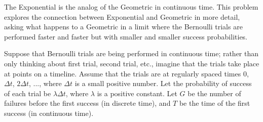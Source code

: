 

\setcounter{theorem}{42}
\begin{exercise}[BH.5.43] The Exponential is the analog of the Geometric in continuous time. This problem explores the connection between Exponential and Geometric in more detail, asking what happens to a Geometric in a limit where the Bernoulli trials are performed faster and faster but with smaller and smaller success probabilities.
	
	Suppose that Bernoulli trials are being performed in continuous time; rather than only thinking about first trial, second trial, etc., imagine that the trials take place at points on a timeline. Assume that the trials are at regularly spaced times $0$, $\Delta t$, $2 \Delta t$, ..., where $\Delta t$ is a small positive number. Let the probability of success of each trial be $\lambda \Delta t$, where $\lambda$ is a positive constant. Let $G$ be the number of failures before the first success (in discrete time), and $T$ be the time of the first success (in continuous time).
	

\end{exercise}
